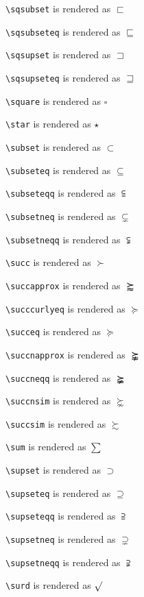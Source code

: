\texttt{\textbackslash sqsubset} is rendered as $\sqsubset$

\texttt{\textbackslash sqsubseteq} is rendered as $\sqsubseteq$

\texttt{\textbackslash sqsupset} is rendered as $\sqsupset$

\texttt{\textbackslash sqsupseteq} is rendered as $\sqsupseteq$

\texttt{\textbackslash square} is rendered as $\square$

\texttt{\textbackslash star} is rendered as $\star$

\texttt{\textbackslash subset} is rendered as $\subset$

\texttt{\textbackslash subseteq} is rendered as $\subseteq$

\texttt{\textbackslash subseteqq} is rendered as $\subseteqq$

\texttt{\textbackslash subsetneq} is rendered as $\subsetneq$

\texttt{\textbackslash subsetneqq} is rendered as $\subsetneqq$

\texttt{\textbackslash succ} is rendered as $\succ$

\texttt{\textbackslash succapprox} is rendered as $\succapprox$

\texttt{\textbackslash succcurlyeq} is rendered as $\succcurlyeq$

\texttt{\textbackslash succeq} is rendered as $\succeq$

\texttt{\textbackslash succnapprox} is rendered as $\succnapprox$

\texttt{\textbackslash succneqq} is rendered as $\succneqq$

\texttt{\textbackslash succnsim} is rendered as $\succnsim$

\texttt{\textbackslash succsim} is rendered as $\succsim$

\texttt{\textbackslash sum} is rendered as $\sum$

\texttt{\textbackslash supset} is rendered as $\supset$

\texttt{\textbackslash supseteq} is rendered as $\supseteq$

\texttt{\textbackslash supseteqq} is rendered as $\supseteqq$

\texttt{\textbackslash supsetneq} is rendered as $\supsetneq$

\texttt{\textbackslash supsetneqq} is rendered as $\supsetneqq$

\texttt{\textbackslash surd} is rendered as $\surd$

